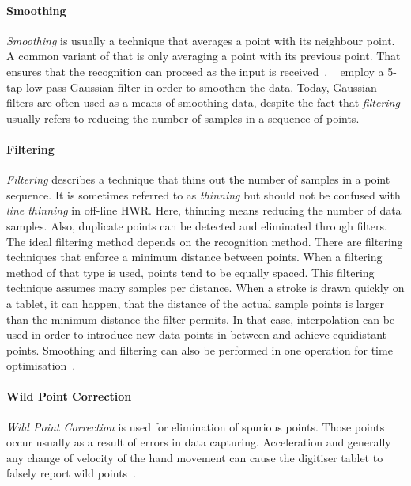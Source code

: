 \paragraph{Smoothing}
\label{sec:smoothing}
\emph{Smoothing} is usually a technique that averages a point with its 
neighbour point. A common variant of that is only averaging a point with its
previous point. That ensures that the recognition can proceed as the input
is received~. 
~\citeyear{Joshi2005} employ a 5-tap low 
pass Gaussian filter in order to smoothen the data. Today, Gaussian filters are 
often used as a means of smoothing data, despite the fact that \emph{filtering}
usually refers to reducing the number of samples in a sequence of points.

\paragraph{Filtering}
\label{sec:filtering}
\emph{Filtering} describes a technique that thins out the number of samples in 
a point sequence. It is sometimes referred to as \emph{thinning} but should not 
be confused with \emph{line thinning} in off-line HWR. Here, thinning means 
reducing the number of data samples. Also, duplicate points can be detected
and eliminated through filters.
The ideal filtering method depends on the recognition method. There are 
filtering techniques that enforce a minimum distance between points. When a 
filtering method of that type is used, points tend to be equally spaced.
This filtering technique assumes many samples per distance. When a stroke is 
drawn quickly on a tablet, it can happen, that the distance of the actual sample 
points is larger than the minimum distance the filter permits. In that case,
interpolation can be used in order to introduce new data points in between and
achieve equidistant points. Smoothing and filtering can also be performed in one 
operation for time optimisation~.

\paragraph{Wild Point Correction}
\label{sec:wildpointcorrection}
\emph{Wild Point Correction} is used for elimination of spurious points. Those 
points occur usually as a result of errors in data capturing. Acceleration and 
generally any change of velocity of the hand movement can cause the digitiser 
tablet to falsely report wild points~.

